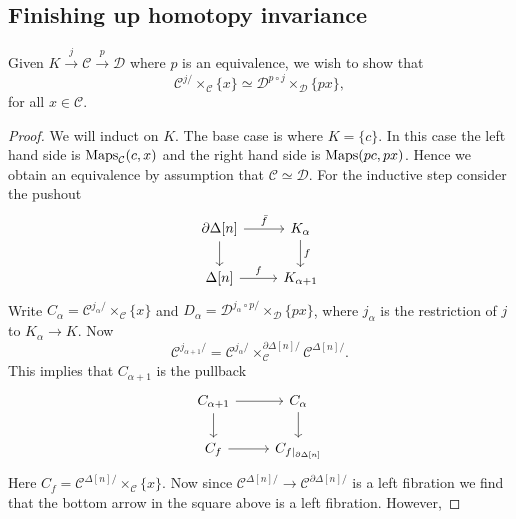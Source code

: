 \documentclass{amsart}
\begin{document}
\subsection{Finishing up homotopy invariance}

\begin{lemma}[HTT 2.4.5.1]
    Given $K\xrightarrow{j}\mathcal{C}\xrightarrow{p}\mathcal{D}$ where $p$ is an
    equivalence, we wish to show that
    \begin{equation*}
        \mathcal{C}^{j/}\times_\mathcal{C}\{x\} \simeq \mathcal{D}^{p\circ j}\times_\mathcal{D}\{px\},
    \end{equation*}
    for all $x\in \mathcal{C}$.
\end{lemma}
\begin{proof}
    We will induct on $K$. The base case is where $K=\{c\}$. In this case the left hand side is
    $\operatorname{Maps}_\mathcal{C}(c,x)$ and the right hand side is $\operatorname{Maps}(pc,px)$. Hence we obtain an
    equivalence by assumption that $\mathcal{C}\simeq \mathcal{D}$. For the inductive step consider
    the pushout
    \begin{equation*}
        \begin{tikzcd}
            \partial\Delta[n] \rar{\bar f}\dar & K_\alpha\dar{f} \\
            \Delta[n] \rar{f} & K_{\alpha+1}
        \end{tikzcd}
    \end{equation*}
    Write $C_\alpha=\mathcal{C}^{j_\alpha/}\times_\mathcal{C}\{x\}$ and
    $D_\alpha=\mathcal{D}^{j_\alpha\circ p/}\times_\mathcal{D}\{px\}$,
    where $j_\alpha$ is the restriction of $j$ to $K_\alpha\to K$. Now
    \begin{equation*}
        \mathcal{C}^{j_{\alpha+1}/} = \mathcal{C}^{j_\alpha/}\times_\mathcal{C}^{\partial\Delta[n]/} \mathcal{C}^{\Delta[n]/}.
    \end{equation*}
    This implies that $C_{\alpha+1}$ is the pullback
    \begin{equation*}
        \begin{tikzcd}
            C_{\alpha+1}\rar\dar & C_\alpha\dar \\
            C_f \rar & C_{f|_{\partial\Delta[n]}}
        \end{tikzcd}
    \end{equation*}
    Here $C_f=\mathcal{C}^{\Delta[n]/}\times_\mathcal{C}\{x\}$.
    Now since $\mathcal{C}^{\Delta[n]/}\to \mathcal{C}^{\partial\Delta[n]/}$ is a left fibration
    we find that the bottom arrow in the square above is a left fibration. However,

\end{proof}
\end{document}
